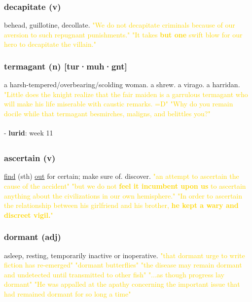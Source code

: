 \documentclass{proc}
\begin{document}
	\subsubsection{\textcolor{brickred}{decapitate} (v)}
	behead,
	guillotine,
	decollate.
	\textcolor{gold}{"We do not decapitate criminals because of our aversion to such repugnant punishments." "It takes \textbf{but one} swift blow for our hero to decapitate the villain."}
	
	\subsubsection{\textcolor{brickred}{termagant} (n) [tur·muh·gnt]}
	a harsh-tempered/overbearing/scolding woman. a shrew. a virago. a harridan.
	\textcolor{gold}{"Little does the knight realize that the fair maiden is a garrulous termagant who will make his life miserable with caustic remarks. =D" "Why do you remain docile while that termagant besmirches, maligns, and belittles you?"}\\\\
	- \textbf{lurid}: week 11
	
	\newpage
	\setcounter{section}{46}
	\setcounter{subsection}{0}
	
	\subsection{}
	\subsubsection{\textcolor{brickred}{ascertain} (v)}
	\underline{find} (sth) \underline{out} for certain; make sure of. discover.
	\textcolor{gold}{"an attempt to ascertain the cause of the accident" "but we do not \textbf{feel it incumbent upon us} to ascertain anything about the civilizations in our own hemisphere." "In order to ascertain the relationship between his girlfriend and his brother, \textbf{he kept a wary and discreet vigil.}"}
	
	\subsubsection{\textcolor{brickred}{dormant} (adj)}
	asleep, resting, temporarily inactive or inoperative.
	\textcolor{gold}{"that dormant urge to write fiction has re-emerged" "dormant butterflies" "the disease may remain dormant and undetected until transmitted to other fish" "...as though progress lay dormant" "He was appalled at the apathy concerning the important issue that had remained dormant for so long a time"}
	
\end{document}
